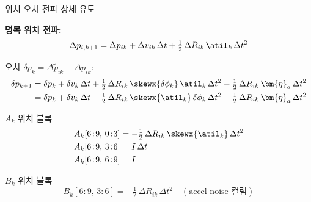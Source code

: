 \begin{frame}[shrink=10]{위치 오차 전파 상세 유도}

  \textbf{명목 위치 전파:}
  \[
    \Delta p_{i,k+1}
    = \Delta p_{ik} + \Delta v_{ik}\,\Delta t
      + \tfrac{1}{2}\,\Delta R_{ik}\,\atil_k\,\Delta t^2
  \]

  \pause
  오차 $\delta p_k = \Delta\tilde{p}_{ik} - \Delta p_{ik}$:
  \begin{align*}
    \delta p_{k+1}
    &= \delta p_k
      + \delta v_k\,\Delta t
      + \tfrac{1}{2}\,\Delta R_{ik}\,\skewx{\delta\phi_k}\,\atil_k\,\Delta t^2
      - \tfrac{1}{2}\,\Delta R_{ik}\,\bm{\eta}_a\,\Delta t^2 \\
    &= \delta p_k
      + \delta v_k\,\Delta t
      - \tfrac{1}{2}\,\Delta R_{ik}\,\skewx{\atil_k}\,\delta\phi_k\,\Delta t^2
      - \tfrac{1}{2}\,\Delta R_{ik}\,\bm{\eta}_a\,\Delta t^2
  \end{align*}

  \pause
  \begin{block}{$A_k$ 위치 블록}
    \begin{align*}
      A_k[6\!:\!9,\, 0\!:\!3]
        &= -\tfrac{1}{2}\,\Delta R_{ik}\,\skewx{\atil_k}\,\Delta t^2 \\
      A_k[6\!:\!9,\, 3\!:\!6]
        &= I\,\Delta t \\
      A_k[6\!:\!9,\, 6\!:\!9]
        &= I
    \end{align*}
  \end{block}

  \begin{block}{$B_k$ 위치 블록}
    \[
      B_k[6\!:\!9,\, 3\!:\!6]
      = -\tfrac{1}{2}\,\Delta R_{ik}\,\Delta t^2
      \quad (\text{accel noise 컬럼})
    \]
  \end{block}
\end{frame}

